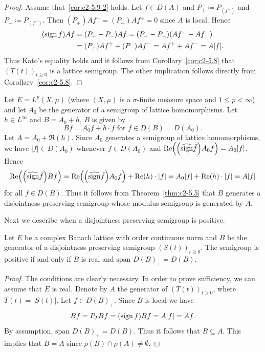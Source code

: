 \begin{proof}
Assume that~\ref{cor:c2-5.9-2}   holds. 
Let $f \in D(A)$ and $P_{+} \coloneq P_{(f^{+})}$ and $P_{-} \coloneq P_{(f^{-})}$.
Then 
$(P_{+})Af^{-} = (P_{-})Af^{+} = 0$ since $A$ is local. 
Hence 
\begin{equation*}
    \begin{split}
    (\operatorname{sign}  f)Af &= (P_{+} - P_{-})Af = (P_{+} - P_{-})(Af^{+} - Af^{-})\\ 
    &= (P_{+})Af^{+} + (P_{-})Af^{-} = Af^{+} + Af^{-} = A|f| .
    \end{split}
\end{equation*}
Thus Kato's equality holds and it follows from Corollary~\ref{cor:c2-5.8}   that $(T(t))_{t \geq 0}$ is a lattice semigroup. The other implication follows directly from Corollary~\ref{cor:c2-5.8}.
\end{proof}
\begin{example}\label{ex:c2-5.10}
Let $E = L^{p}(X,\mu)$ (where $(X,\mu)$ is a $\sigma$-finite measure space and $1 \leq p < \infty$) and let $A_{0}$ be the generator of a semigroup of lattice homomorphisms. 
Let $h \in L^{\infty}$ and $B = A_{0} + h$, \ie $B$ is given by 
\[
Bf = A_{0}f + h \cdot f  \text{ for } f \in D(B) = D(A_{0}) . 
\]
Let $A = A_{0} + \Re(h)$.
Since $A_{0}$ generates a semigroup of lattice homomorphisms, we have $|f| \in D(A_{0})$ whenever $f \in D(A_{0})$ and $\Re\mleft(\mleft( \widehat{\sign} \bar{f}\mright)A_{0}f\mright) = A_{0}|f|$.
Hence 
\[\Re\mleft(\mleft(\widehat{\sign}  \bar{f}\mright)Bf\mright) = \Re\mleft(\mleft(\widehat{\sign}  \bar{f}\mright)A_{0}f\mright) + \Re(h) \cdot |f| = A_{0}|f| + \Re(h) \cdot |f| = A|f|
\]
for all $f \in D(B)$. 
Thus it follows from Theorem~\ref{thm:c2-5.5}   that $B$ generates a disjointness preserving semigroup whose modulus semigroup is generated by $A$.
\end{example}
Next we describe when a disjointness preserving semigroup is positive.
\begin{proposition}\label{prop:c2-5.11}
%
Let $E$ be a complex Banach lattice with order continuous norm and $B$ be the generator of a disjointness preserving semigroup $(S(t))_{t \geq 0}$. 
The semigroup is positive if and only if\/ $B$ is real and $\text{span } D(B)_{+} = D(B)$.
\end{proposition}
\begin{proof}
The conditions are clearly necessary. 
In order to prove sufficiency, we can assume that $E$ is real. 
Denote by $A$ the generator of\/ $(T(t))_{t \geq 0}$, where $T(t) = |S(t)|$. 
Let $f \in D(B)_{+}$. 
Since $B$ is local we have 
\[
Bf = P_{f}Bf = (\operatorname{sign}  f)Bf = A|f| = Af .
\]
By assumption, $\text{span } D(B)_{+} = D(B)$. 
Thus it follows that $B \subseteq A$. 
This implies that $B = A$ since $\rho(B) \cap \rho(A) \neq \emptyset$.
\end{proof}
